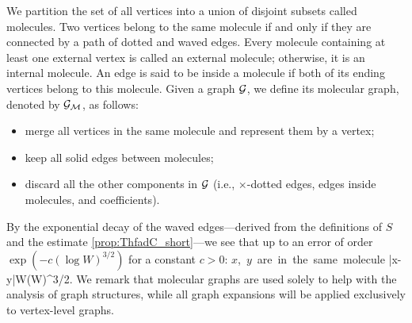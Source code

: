 \begin{definition}\label{def_poly}
We partition the set of all vertices into a union of disjoint subsets called molecules. Two vertices belong to the same molecule if and only if they are connected by a path of dotted and waved edges. Every molecule containing at least one external vertex is called an external molecule; otherwise, it is an internal molecule. An edge is said to be inside a molecule if both of its ending vertices belong to this molecule. 
Given a graph $\cal G$, we define its molecular graph, denoted by $ \cal G_{\cal M}$, as follows:
	\begin{itemize}
		\item merge all vertices in the same molecule and represent them by a vertex;
		
		\item keep all solid edges between molecules;

		\item discard all the other components in $\cal G$ (i.e., $\times$-dotted edges, edges inside molecules, and coefficients).
	\end{itemize}
\end{definition}

By the exponential decay of the waved edges---derived from the definitions of $S$ and the estimate \eqref{prop:ThfadC_short}---we see that up to an error of order $\exp(-c(\log W)^{3/2})$ for a constant $c>0$:  
\be\label{scalemole}
 \hbox{$x$, $y$ are in the same molecule} \implies  |x-y|\le  W(\log W)^{3/2}.
\ee
We remark that molecular graphs are used solely to help with the analysis of graph structures, while all graph expansions will be applied exclusively to vertex-level graphs. 

